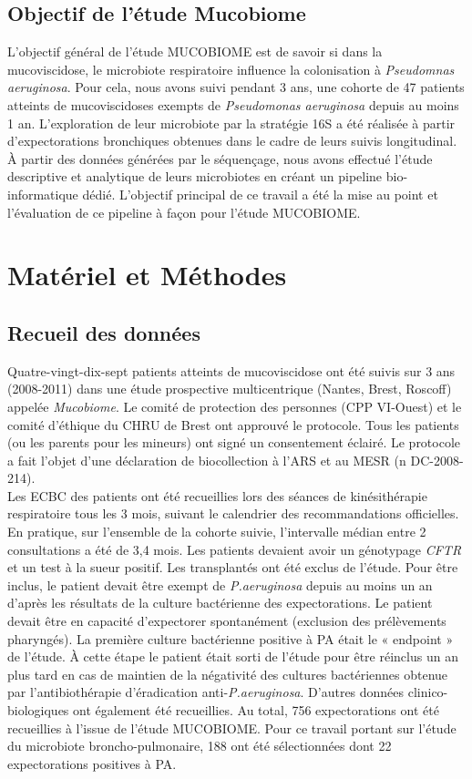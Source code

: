 \documentclass[12pt,a4paper]{article}
\begin{document}
\subsection{Objectif de l'étude Mucobiome}
L'objectif général de l'étude MUCOBIOME est de savoir si dans la mucoviscidose, le microbiote respiratoire influence la colonisation à \textit{Pseudomnas aeruginosa}.
Pour cela, nous avons suivi pendant 3 ans,  une cohorte de 47 patients atteints de mucoviscidoses exempts de \textit{Pseudomonas aeruginosa} depuis au moins 1 an.
L'exploration de leur microbiote par la stratégie 16S a été réalisée à partir d'expectorations bronchiques obtenues dans le cadre de leurs suivis longitudinal.
À partir des données générées par le séquençage, nous avons effectué l'étude descriptive et analytique de leurs microbiotes en créant un pipeline bio-informatique dédié. L'objectif principal de ce travail a été la mise au point et l'évaluation de ce pipeline à façon pour l'étude MUCOBIOME.

\section{Matériel et Méthodes}
\subsection{Recueil des données}

Quatre-vingt-dix-sept patients atteints de mucoviscidose ont été suivis sur 3 ans (2008-2011) dans une étude prospective multicentrique (Nantes, Brest, Roscoff) appelée \textit{Mucobiome}.
Le comité de protection des personnes (CPP VI-Ouest) et le comité d’éthique du CHRU de Brest ont approuvé le protocole. Tous les patients (ou les parents pour les mineurs) ont signé un consentement éclairé. Le protocole a fait l’objet d’une déclaration de biocollection à l’ARS et au MESR (n DC-2008-214).\\
Les ECBC des patients ont été recueillies lors des séances de kinésithérapie respiratoire tous les 3 mois, suivant le calendrier des recommandations officielles. En pratique, sur l’ensemble de la cohorte suivie, l’intervalle médian entre 2 consultations a été de 3,4 mois.
Les patients devaient avoir un génotypage \textit{CFTR} et un test à la sueur positif. Les transplantés ont été exclus de l’étude.
Pour être inclus, le patient devait être exempt de \textit{P.aeruginosa} depuis au moins un an d’après les résultats de la culture bactérienne des expectorations. Le patient devait être en capacité d’expectorer spontanément (exclusion des prélèvements pharyngés).
La première culture bactérienne positive à PA était le « endpoint » de l’étude. À cette étape le patient était sorti de l’étude pour être réinclus un an plus tard en cas de maintien de la négativité des cultures bactériennes obtenue par l’antibiothérapie d’éradication anti-\textit{P.aeruginosa}. D’autres données clinico-biologiques ont également été recueillies. Au total, 756 expectorations ont été recueillies à l’issue de l’étude MUCOBIOME. Pour ce travail portant sur l’étude du microbiote broncho-pulmonaire, 188 ont été sélectionnées dont 22 expectorations positives à PA.
\end{document}
